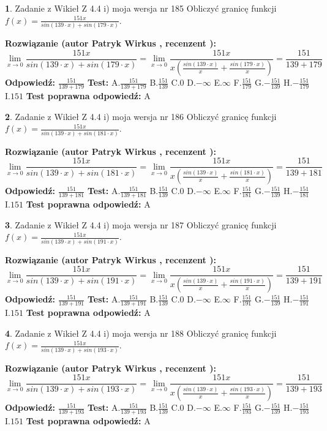 \documentclass[12pt, a4paper]{article}
\theoremstyle{definition} %
\newtheorem{zad}{}
\newcommand{\zadStart}[1]{\begin{zad}#1\newline}
\newcommand{\zadStop}{\end{zad}}
\newcommand{\rozwStart}[2]{\noindent \textbf{Rozwiązanie (autor #1 , recenzent #2): }\newline}
\newcommand{\rozwStop}{\newline}
\newcommand{\odpStart}{\noindent \textbf{Odpowiedź:}\newline}
\newcommand{\odpStop}{\newline}
\newcommand{\testStart}{\noindent \textbf{Test:}\newline}
\newcommand{\testStop}{\newline}
\newcommand{\kluczStart}{\noindent \textbf{Test poprawna odpowiedź:}\newline}
\newcommand{\kluczStop}{\newline}
\begin{document}
\zadStart{Zadanie z Wikieł Z 4.4 i) moja wersja nr 185}
Obliczyć granicę funkcji $f(x)=\frac{151x}{sin(139\cdot x) +sin(179\cdot x)}$.
\zadStop
\rozwStart{Patryk Wirkus}{}
$$\lim\limits_{x\to 0}\frac{151x}{sin(139\cdot x) +sin(179\cdot x)}=\lim\limits_{x\to 0}\frac{151x}{x(\frac{sin(139\cdot x)}{x}+\frac{sin(179\cdot x)}{x})}=\frac{151}{139+179}$$
\rozwStop
\odpStart
$\frac{151}{139+179}$
\odpStop
\testStart
A.$\frac{151}{139+179}$
B.$\frac{151}{139}$
C.$0$
D.$-\infty$
E.$\infty$
F.$\frac{151}{179}$
G.$-\frac{151}{139}$
H.$-\frac{151}{179}$
I.$151$
\testStop
\kluczStart
A
\kluczStop



\zadStart{Zadanie z Wikieł Z 4.4 i) moja wersja nr 186}
Obliczyć granicę funkcji $f(x)=\frac{151x}{sin(139\cdot x) +sin(181\cdot x)}$.
\zadStop
\rozwStart{Patryk Wirkus}{}
$$\lim\limits_{x\to 0}\frac{151x}{sin(139\cdot x) +sin(181\cdot x)}=\lim\limits_{x\to 0}\frac{151x}{x(\frac{sin(139\cdot x)}{x}+\frac{sin(181\cdot x)}{x})}=\frac{151}{139+181}$$
\rozwStop
\odpStart
$\frac{151}{139+181}$
\odpStop
\testStart
A.$\frac{151}{139+181}$
B.$\frac{151}{139}$
C.$0$
D.$-\infty$
E.$\infty$
F.$\frac{151}{181}$
G.$-\frac{151}{139}$
H.$-\frac{151}{181}$
I.$151$
\testStop
\kluczStart
A
\kluczStop



\zadStart{Zadanie z Wikieł Z 4.4 i) moja wersja nr 187}
Obliczyć granicę funkcji $f(x)=\frac{151x}{sin(139\cdot x) +sin(191\cdot x)}$.
\zadStop
\rozwStart{Patryk Wirkus}{}
$$\lim\limits_{x\to 0}\frac{151x}{sin(139\cdot x) +sin(191\cdot x)}=\lim\limits_{x\to 0}\frac{151x}{x(\frac{sin(139\cdot x)}{x}+\frac{sin(191\cdot x)}{x})}=\frac{151}{139+191}$$
\rozwStop
\odpStart
$\frac{151}{139+191}$
\odpStop
\testStart
A.$\frac{151}{139+191}$
B.$\frac{151}{139}$
C.$0$
D.$-\infty$
E.$\infty$
F.$\frac{151}{191}$
G.$-\frac{151}{139}$
H.$-\frac{151}{191}$
I.$151$
\testStop
\kluczStart
A
\kluczStop



\zadStart{Zadanie z Wikieł Z 4.4 i) moja wersja nr 188}
Obliczyć granicę funkcji $f(x)=\frac{151x}{sin(139\cdot x) +sin(193\cdot x)}$.
\zadStop
\rozwStart{Patryk Wirkus}{}
$$\lim\limits_{x\to 0}\frac{151x}{sin(139\cdot x) +sin(193\cdot x)}=\lim\limits_{x\to 0}\frac{151x}{x(\frac{sin(139\cdot x)}{x}+\frac{sin(193\cdot x)}{x})}=\frac{151}{139+193}$$
\rozwStop
\odpStart
$\frac{151}{139+193}$
\odpStop
\testStart
A.$\frac{151}{139+193}$
B.$\frac{151}{139}$
C.$0$
D.$-\infty$
E.$\infty$
F.$\frac{151}{193}$
G.$-\frac{151}{139}$
H.$-\frac{151}{193}$
I.$151$
\testStop
\kluczStart
A
\kluczStop
\end{document}
